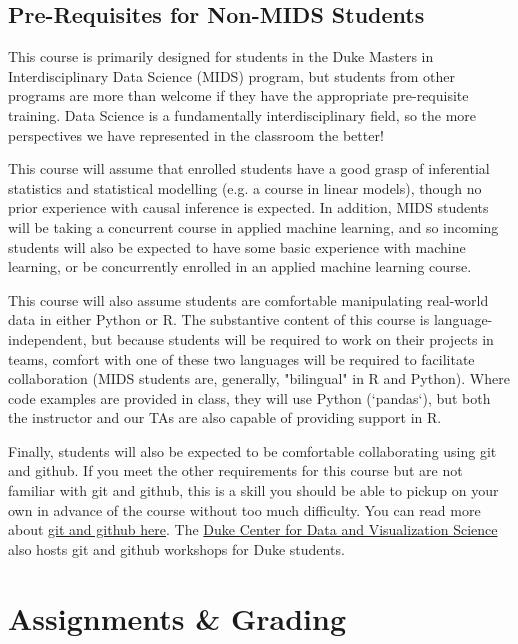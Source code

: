 \documentclass[12pt]{article}
\begin{document}
\subsection{Pre-Requisites for Non-MIDS Students}

This course is primarily designed for students in the Duke Masters in Interdisciplinary Data Science (MIDS) program, but students from other programs are more than welcome if they have the appropriate pre-requisite training. Data Science is a fundamentally interdisciplinary field, so the more perspectives we have represented in the classroom the better!

This course will assume that enrolled students have a good grasp of inferential statistics and statistical modelling (e.g. a course in linear models), though no prior experience with causal inference is expected. In addition, MIDS students will be taking a concurrent course in applied machine learning, and so incoming students will also be expected to have some basic experience with machine learning, or be concurrently enrolled in an applied machine learning course.

This course will also assume students are comfortable manipulating real-world data in either Python or R. The substantive content of this course is language-independent, but because students will be required to work on their projects in teams, comfort with one of these two languages will be required to facilitate collaboration (MIDS students are, generally, "bilingual" in R and Python). Where code examples are provided in class, they will use Python (`pandas`), but both the instructor and our TAs are also capable of providing support in R.

Finally, students will also be expected to be comfortable collaborating using git and github. If you meet the other requirements for this course but are not familiar with git and github, this is a skill you should be able to pickup on your own in advance of the course without too much difficulty. You can read more about \href{https://www.practicaldatascience.org/html/git_and_github.html}{git and github here}. The \href{https://library.duke.edu/data/}{Duke Center for Data and Visualization Science} also hosts git and github workshops for Duke students.


\section{Assignments \& Grading}
\end{document}

